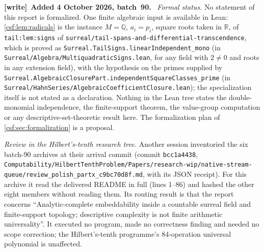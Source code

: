\documentclass[11pt,a4paper]{article}
\numberwithin{equation}{section}
\theoremstyle{definition}
\theoremstyle{remark}
\newcommand{\Q}{\mathbb Q}
\newcommand{\R}{\mathbb R}
\newcommand{\repo}[1]{\nolinkurl{#1}}
\newcommand{\lbl}[1]{\nolinkurl{#1}}
\newenvironment{writenote}[1][]{\par\smallskip\begingroup\small\raggedright
 \setlength{\parindent}{1.25em}\noindent\textbf{[write]}\if\relax\detokenize{#1}\relax\else~\textbf{#1.}\fi\ }%
 {\par\endgroup\smallskip}
\begin{document}
\begin{writenote}[Added 4 October 2026, batch~90]
\emph{Formal status.} No statement of this report is formalized. One finite algebraic input is available in Lean: \cref{csf:lem:radicals} is the instance $M=\Q$, $a_i=p_i$, square roots taken in $\R$, of \lbl{tail:lem:signs} of \repo{surreal/tail-spans-and-differential-transcendence}, which is proved as \texttt{Surreal.TailSigns.linearIndependent\_mono} (in \repo{Surreal/Algebra/MultiquadraticSigns.lean}, for any field with $2\ne0$ and roots in any extension field), with the hypothesis on the primes supplied by \texttt{Surreal.AlgebraicClosurePart.independentSquareClasses\_prime} (in \repo{Surreal/HahnSeries/AlgebraicCoefficientClosure.lean}); the specialization itself is not stated as a declaration. Nothing in the Lean tree states the double-monomial independence, the finite-support theorem, the value-group computation or any descriptive-set-theoretic result here. The formalization plan of \cref{csf:sec:formalization} is a proposal.

\emph{Review in the Hilbert's-tenth research tree.} Another session inventoried the six batch-90 archives at their arrival commit (commit \texttt{bcc1a4438}, \repo{Computability/HilbertTenthProblem/Papers/research-wip/native-stream-queue/review_polish_partx_c9bc70d8f.md}, with its JSON receipt). For this archive it read the delivered README in full (lines 1--86) and hashed the other eight members without reading them. Its routing result is that the report concerns ``Analytic-complete embeddability inside a countable surreal field and finite-support topology; descriptive complexity is not finite arithmetic universality''. It executed no program, made no correctness finding and needed no scope correction; the Hilbert's-tenth programme's 84-operation universal polynomial is unaffected.


\end{writenote}
\end{document}
